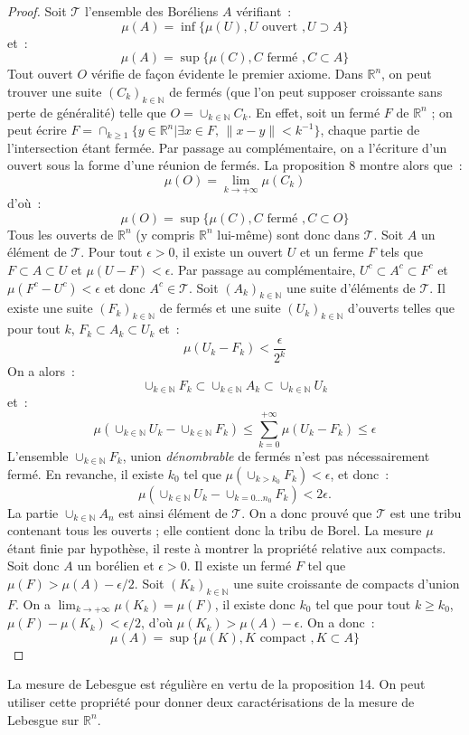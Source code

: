 \begin{proof}
Soit $\mathcal{T}$ l'ensemble des Boréliens $A$ vérifiant~:
\[
\mu(A) = \inf \{ \mu(U), U \mbox{ ouvert }, U \supset A \}
\]
et~:
\[
\mu(A) = \sup \{ \mu(C), C \mbox{ fermé }, C \subset A \}
\]
Tout ouvert $O$ vérifie de façon évidente le premier axiome. Dans
$\mathbb{R}^n$, on peut trouver une suite $(C_k)_{k \in \mathbb{N}}$ de fermés (que l'on
peut supposer croissante sans perte de généralité) telle que
$O = \cup_{k \in \mathbb{N}} C_k$. En effet, soit un fermé $F$ de $\mathbb{R}^n$ ; on
peut écrire $F = \cap_{k \geq 1}  \{ y \in \mathbb{R}^n | \exists x \in F, \,
\| x-y\| < k^{-1} \}$, chaque partie de l'intersection étant
fermée. Par passage au complémentaire, on a l'écriture d'un ouvert sous
la forme d'une réunion de fermés. La proposition 8 montre alors que~:
\[
\mu(O) = \lim_{k \to +\infty} \mu(C_k)
\]
d'où~:
\[
\mu(O) = \sup \{ \mu(C), C \mbox{ fermé }, C \subset O \}
\]
Tous les ouverts de $\mathbb{R}^n$ (y compris $\mathbb{R}^n$ lui-même)
sont donc dans $\mathcal{T}$.
Soit $A$ un élément de $\mathcal{T}$. Pour tout $\epsilon > 0$, il existe un
ouvert $U$ et un ferme $F$ tels que $F \subset A \subset U$ et $\mu(U-F) <
\epsilon$. Par passage au complémentaire, $U^c \subset A^c \subset
F^c$ et $\mu(F^c -U^c) < \epsilon$ et donc $A^c \in \mathcal{T}$. Soit
$(A_k)_{k \in  \mathbb{N}}$ une suite d'éléments de $\mathcal{T}$. Il existe une suite
$(F_k)_{k \in \mathbb{N}}$ de fermés et une suite $(U_k)_{k \in \mathbb{N}}$ d'ouverts telles que pour tout
$k$, $F_k \subset A_k \subset U_k$ et~:
\[ 
\mu(U_k - F_k) < \frac{\epsilon}{2^k}
\]
On a alors~:
\[
\cup_{k \in \mathbb{N}}  F_k \subset \cup_{k \in \mathbb{N}} A_k
\subset \cup_{k \in \mathbb{N}} U_k
\]
et~:
\[
\mu( \cup_{k \in \mathbb{N}} U_k -\cup_{k \in \mathbb{N}} F_k) \leq \sum_{k=0}^{+\infty} \mu(U_k-F_k) \leq \epsilon 
\]
L'ensemble $\cup_{k \in \mathbb{N}} F_k$, union {\em dénombrable} de fermés n'est pas
nécessairement fermé. En revanche, il existe $k_0$ tel que
$\mu(\cup_{k > k_0} F_k) < \epsilon$, et donc~:
\[
\mu( \cup_{k \in \mathbb{N}} U_k - \cup_{k=0\dots n_0} F_k) < 2 \epsilon.
\]
La partie $\cup_{k \in \mathbb{N}} A_n$ est ainsi élément de $\mathcal{T}$. On a donc
prouvé que $\mathcal{T}$ est une tribu contenant tous les
ouverts ; elle contient donc la tribu de Borel.
La mesure $\mu$ étant finie par hypothèse, il reste à montrer la
propriété relative aux compacts. 
Soit donc $A$ un borélien et $\epsilon > 0$. Il existe un fermé $F$
tel que $\mu(F) > \mu(A) - \epsilon/2$. Soit $(K_k)_{k \in \mathbb{N}}$ une suite
croissante de compacts d'union $F$. On a $\lim_{k \to +\infty} \mu(K_k) = \mu(F)$,
il existe donc $k_0$ tel que pour tout $k \geq k_0$, $\mu(F) - \mu(K_k)  < \epsilon/2$, d'où
$\mu(K_k) > \mu(A) - \epsilon$. On a donc~:
\[
\mu(A) = \sup \{ \mu(K), K \mbox{ compact }, K \subset A \}
\]
\end{proof}
La mesure de Lebesgue est régulière en vertu de la proposition 14. On
peut utiliser cette propriété pour donner deux caractérisations de la
mesure de Lebesgue sur $\mathbb{R}^n$.


